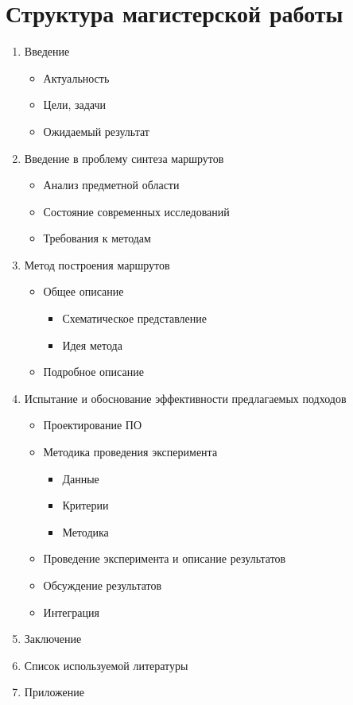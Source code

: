 \chapter{Структура магистерской работы}
\begin{enumerate}\itemsep-5pt
    \item Введение
    \vspace*{-1em}
    \begin{itemize}\itemsep-5pt
        \item Актуальность
        \item Цели, задачи
        \item Ожидаемый результат
    \end{itemize}
    \item Введение в проблему синтеза маршрутов
    \vspace*{-1em}
    \begin{itemize}\itemsep-5pt\itemsep-5pt
        \item Анализ предметной области
        \item Состояние современных исследований
        \item Требования к методам
    \end{itemize}
    \item Метод построения маршрутов
    \vspace*{-1em}
    \begin{itemize}\itemsep-5pt
        \item Общее описание
        \begin{itemize}\itemsep-5pt
            \item Схематическое представление
            \item Идея метода
        \end{itemize}
        \item Подробное описание
    \end{itemize}
    \item Испытание и обоснование эффективности предлагаемых подходов
    \vspace*{-1em}
    \begin{itemize}\itemsep-5pt
        \item Проектирование ПО
        \item Методика проведения эксперимента
        \vspace*{-1em}
        \begin{itemize}\itemsep-5pt
            \item Данные 
            \item Критерии
            \item Методика
        \end{itemize}
        \item Проведение эксперимента и описание результатов
        \item Обсуждение результатов
        \item Интеграция
    \end{itemize}
    \item Заключение
    \item Список используемой литературы
    \item Приложение
\end{enumerate}


